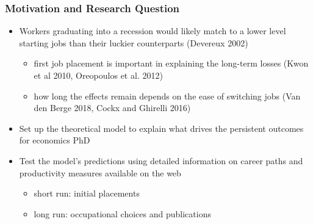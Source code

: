 \documentclass[11pt]{beamer}
\begin{document}
\begin{frame}[label = motivation]
	\frametitle{Motivation and Research Question} 
	\begin{itemize}

			\item Workers graduating into a recession would likely match to a lower level starting jobs than their luckier counterparts (Devereux 2002)
		\begin{itemize}
			\item first job placement is important in explaining the long-term losses (Kwon et al 2010, Oreopoulos et al. 2012)
			\vspace{1 mm}
			\item how long the effects remain depends on the ease of switching jobs (Van den Berge 2018, Cockx and Ghirelli 2016)
		\end{itemize}
		

		\vspace{1.5 mm}
	\item Set up the theoretical model to explain what drives the persistent outcomes for economics PhD
		\vspace{1.5 mm}
	\item Test the model's predictions using detailed information on career paths and productivity measures  available on the web
			\begin{itemize}
		\item short run: initial placements
			\vspace{1 mm}
		\item long run: occupational choices and publications 
	\end{itemize}
%			
	

\end{itemize}
\end{frame}
\end{document}
